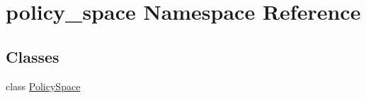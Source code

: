 \hypertarget{namespacepolicy__space}{}\section{policy\+\_\+space Namespace Reference}
\label{namespacepolicy__space}
\subsection*{Classes}
\begin{DoxyCompactItemize}
\item 
class \hyperlink{classpolicy__space_1_1_policy_space}{Policy\+Space}
\end{DoxyCompactItemize}
